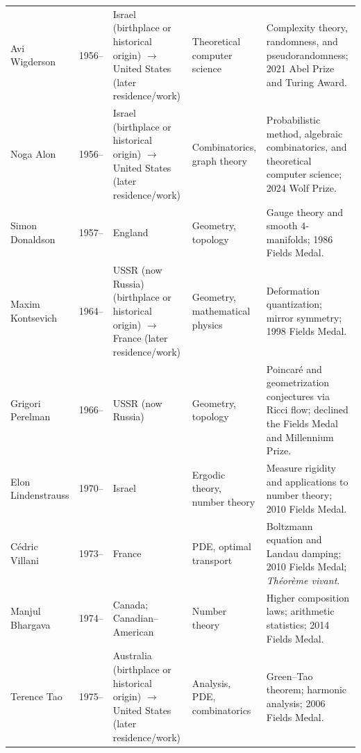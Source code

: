{\begin{longtable}{@{}L{0.145\textwidth}L{0.09\textwidth}L{0.225\textwidth}L{0.14\textwidth}L{0.30\textwidth}@{}}
        Avi Wigderson
        & 1956--
        & Israel (birthplace or historical origin) \(\to\) United States (later residence/work)
        & Theoretical computer science
        & Complexity theory, randomness, and pseudorandomness; 2021 Abel
          Prize and Turing Award. \\

        Noga Alon
        & 1956--
        & Israel (birthplace or historical origin) \(\to\) United States (later residence/work)
        & Combinatorics, graph theory
        & Probabilistic method, algebraic combinatorics, and theoretical
          computer science; 2024 Wolf Prize. \\

        Simon Donaldson
        & 1957--
        & England
        & Geometry, topology
        & Gauge theory and smooth $4$-manifolds; 1986 Fields Medal. \\

        Maxim Kontsevich
        & 1964--
        & USSR (now Russia) (birthplace or historical origin) \(\to\) France (later residence/work)
        & Geometry, mathematical physics
        & Deformation quantization; mirror symmetry; 1998 Fields Medal. \\

        Grigori Perelman
        & 1966--
        & USSR (now Russia)
        & Geometry, topology
        & Poincaré and geometrization conjectures via Ricci flow; declined the
          Fields Medal and Millennium Prize. \\

        Elon Lindenstrauss
        & 1970--
        & Israel
        & Ergodic theory, number theory
        & Measure rigidity and applications to number theory; 2010 Fields
          Medal. \\

        Cédric Villani
        & 1973--
        & France
        & PDE, optimal transport
        & Boltzmann equation and Landau damping; 2010 Fields Medal;
          \textit{Théorème vivant}. \\

        Manjul Bhargava
        & 1974--
        & Canada; Canadian--American
        & Number theory
        & Higher composition laws; arithmetic statistics; 2014 Fields Medal. \\

        Terence Tao
        & 1975--
        & Australia (birthplace or historical origin) \(\to\) United States (later residence/work)
        & Analysis, PDE, combinatorics
        & Green--Tao theorem; harmonic analysis; 2006 Fields Medal. \\


\end{longtable}}
